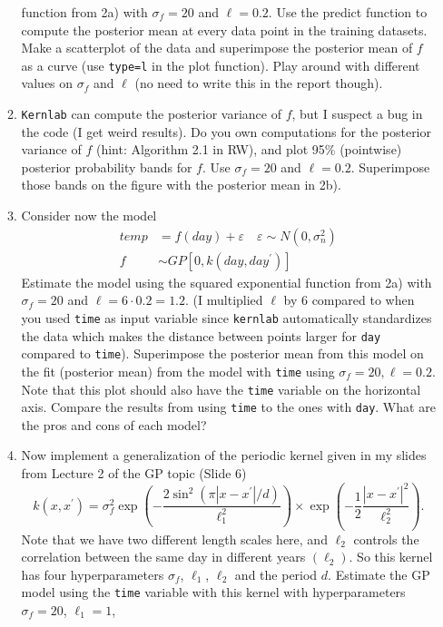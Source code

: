 \documentclass[11pt,english]{article}\usepackage[]{graphicx}\usepackage[]{color}
\begin{document}
\begin{enumerate}
\begin{enumerate}
function from 2a) with $\sigma_{f}=20$ and $\ell=0.2$. Use the predict
function to compute the posterior mean at every data point in the
training datasets. Make a scatterplot of the data and superimpose
the posterior mean of $f$ as a curve (use \texttt{type=\textquotedbl{}l\textquotedbl{}}
in the plot function). Play around with different values on $\sigma_{f}$
and $\ell$ (no need to write this in the report though).
\item \texttt{Kernlab} can compute the posterior variance of $f$, but I
suspect a bug in the code (I get weird results). Do you own computations
for the posterior variance of $f$ (hint: Algorithm 2.1 in RW), and
plot 95\% (pointwise) posterior probability bands for $f$. Use $\sigma_{f}=20$
and $\ell=0.2$. Superimpose those bands on the figure with the posterior
mean in 2b).
\item Consider now the model
\begin{align*}
temp & =f(day)+\varepsilon\quad\varepsilon\sim N(0,\sigma_{n}^{2})\\
f & \sim GP\left[0,k(day,day^{\prime})\right]
\end{align*}
Estimate the model using the squared exponential function from 2a)
with $\sigma_{f}=20$ and $\ell=6\cdot0.2=1.2$. (I multiplied $\ell$
by 6 compared to when you used \texttt{time} as input variable since
\texttt{kernlab} automatically standardizes the data which makes the
distance between points larger for \texttt{day} compared to \texttt{time}).
Superimpose the posterior mean from this model on the fit (posterior
mean) from the model with \texttt{time} using $\sigma_{f}=20,\ell=0.2$.
Note that this plot should also have the \texttt{time} variable on
the horizontal axis. Compare the results from using \texttt{time}
to the ones with \texttt{day}. What are the pros and cons of each
model?
\item Now implement a generalization of the periodic kernel given in my
slides from Lecture 2 of the GP topic (Slide 6)
\[
k(x,x^{\prime})=\sigma_{f}^{2}\exp\left(-\frac{2\sin^{2}\left(\pi\left|x-x^{\prime}\right|/d\right)}{\ell_{1}^{2}}\right)\times\exp\left(-\frac{1}{2}\frac{\left|x-x^{\prime}\right|^{2}}{\ell_{2}^{2}}\right).
\]
Note that we have two different length scales here, and $\ell_{2}$
controls the correlation between the same day in different years $(\ell_{2})$.
So this kernel has four hyperparameters $\sigma_{f}$, $\ell_{1}$,
$\ell_{2}$ and the period $d$. Estimate the GP model using the \texttt{time}
variable with this kernel with hyperparameters $\sigma_{f}=20$, $\ell_{1}=1$,

\end{enumerate}
\end{enumerate}
\end{document}
